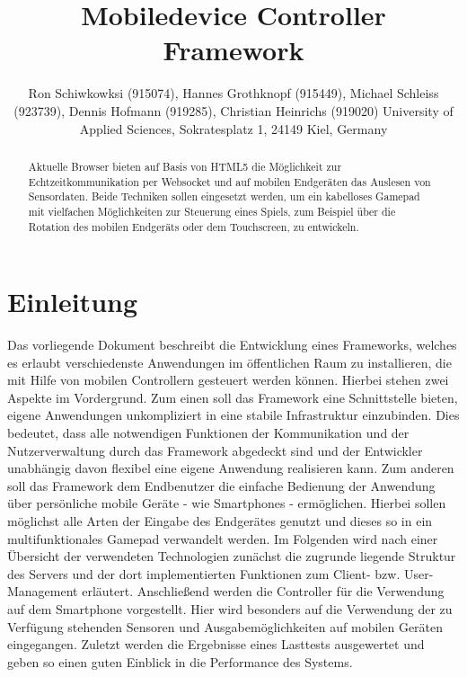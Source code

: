 \documentclass[a4paper]{spie}  %
\title{Mobiledevice Controller Framework}
\author{ Ron Schiwkowksi  (915074), Hannes Grothknopf (915449), Michael Schleiss (923739), Dennis Hofmann (919285), Christian Heinrichs (919020)
\skiplinehalf
University of Applied Sciences, Sokratesplatz 1, 24149 Kiel, Germany
}
\begin{document}
 
  \maketitle 
\begin{abstract} %
Aktuelle Browser bieten auf Basis von HTML5 die Möglichkeit zur Echtzeitkommunikation per Websocket und auf mobilen Endgeräten das Auslesen von Sensordaten. Beide Techniken sollen eingesetzt werden, um ein kabelloses Gamepad mit vielfachen Möglichkeiten zur Steuerung eines Spiels, zum Beispiel über die Rotation des mobilen Endgeräts oder dem Touchscreen, zu entwickeln.
\end{abstract}


\section{Einleitung} %
Das vorliegende Dokument beschreibt die Entwicklung eines Frameworks, welches es erlaubt verschiedenste Anwendungen im öffentlichen Raum zu installieren, die mit Hilfe von mobilen Controllern gesteuert werden können. Hierbei stehen zwei Aspekte im Vordergrund. Zum einen soll das Framework eine Schnittstelle bieten, eigene Anwendungen unkompliziert in eine stabile Infrastruktur einzubinden. Dies bedeutet, dass alle notwendigen Funktionen der Kommunikation und der Nutzerverwaltung durch das Framework abgedeckt sind und der Entwickler unabhängig davon flexibel eine eigene Anwendung realisieren kann. Zum anderen soll das Framework dem Endbenutzer die einfache Bedienung der Anwendung über persönliche mobile Geräte - wie Smartphones - ermöglichen. Hierbei sollen möglichst alle Arten der Eingabe des Endgerätes genutzt und dieses so in ein multifunktionales Gamepad verwandelt werden.
Im Folgenden wird nach einer Übersicht der verwendeten Technologien zunächst die zugrunde liegende Struktur des Servers und der dort implementierten Funktionen zum Client- bzw. User-Management erläutert. Anschließend werden die Controller für die Verwendung auf dem Smartphone vorgestellt. Hier wird besonders auf die Verwendung der zu Verfügung stehenden Sensoren und Ausgabemöglichkeiten auf mobilen Geräten eingegangen. Zuletzt werden die Ergebnisse eines Lasttests ausgewertet und geben so einen guten Einblick in die Performance des Systems.
\end{document}
